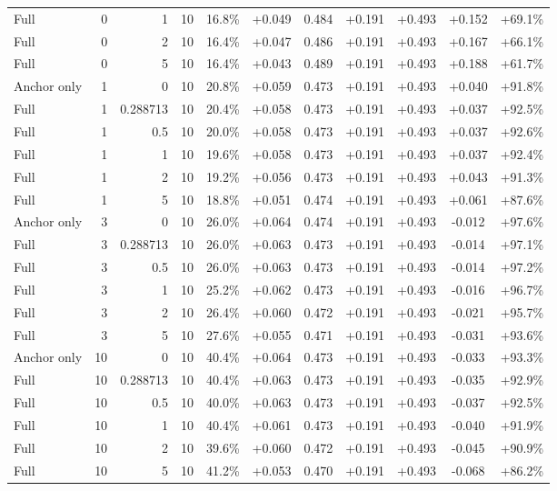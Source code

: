 \begin{table}[htbp]
\begin{tabular}{lrrrccccccc}
Full & 0 & 1 & 10 & 16.8\% & +0.049 & 0.484 & +0.191 & +0.493 & +0.152 & +69.1\% \\
Full & 0 & 2 & 10 & 16.4\% & +0.047 & 0.486 & +0.191 & +0.493 & +0.167 & +66.1\% \\
Full & 0 & 5 & 10 & 16.4\% & +0.043 & 0.489 & +0.191 & +0.493 & +0.188 & +61.7\% \\
Anchor only & 1 & 0 & 10 & 20.8\% & +0.059 & 0.473 & +0.191 & +0.493 & +0.040 & +91.8\% \\
Full & 1 & 0.288713 & 10 & 20.4\% & +0.058 & 0.473 & +0.191 & +0.493 & +0.037 & +92.5\% \\
Full & 1 & 0.5 & 10 & 20.0\% & +0.058 & 0.473 & +0.191 & +0.493 & +0.037 & +92.6\% \\
Full & 1 & 1 & 10 & 19.6\% & +0.058 & 0.473 & +0.191 & +0.493 & +0.037 & +92.4\% \\
Full & 1 & 2 & 10 & 19.2\% & +0.056 & 0.473 & +0.191 & +0.493 & +0.043 & +91.3\% \\
Full & 1 & 5 & 10 & 18.8\% & +0.051 & 0.474 & +0.191 & +0.493 & +0.061 & +87.6\% \\
Anchor only & 3 & 0 & 10 & 26.0\% & +0.064 & 0.474 & +0.191 & +0.493 & -0.012 & +97.6\% \\
Full & 3 & 0.288713 & 10 & 26.0\% & +0.063 & 0.473 & +0.191 & +0.493 & -0.014 & +97.1\% \\
Full & 3 & 0.5 & 10 & 26.0\% & +0.063 & 0.473 & +0.191 & +0.493 & -0.014 & +97.2\% \\
Full & 3 & 1 & 10 & 25.2\% & +0.062 & 0.473 & +0.191 & +0.493 & -0.016 & +96.7\% \\
Full & 3 & 2 & 10 & 26.4\% & +0.060 & 0.472 & +0.191 & +0.493 & -0.021 & +95.7\% \\
Full & 3 & 5 & 10 & 27.6\% & +0.055 & 0.471 & +0.191 & +0.493 & -0.031 & +93.6\% \\
Anchor only & 10 & 0 & 10 & 40.4\% & +0.064 & 0.473 & +0.191 & +0.493 & -0.033 & +93.3\% \\
Full & 10 & 0.288713 & 10 & 40.4\% & +0.063 & 0.473 & +0.191 & +0.493 & -0.035 & +92.9\% \\
Full & 10 & 0.5 & 10 & 40.0\% & +0.063 & 0.473 & +0.191 & +0.493 & -0.037 & +92.5\% \\
Full & 10 & 1 & 10 & 40.4\% & +0.061 & 0.473 & +0.191 & +0.493 & -0.040 & +91.9\% \\
Full & 10 & 2 & 10 & 39.6\% & +0.060 & 0.472 & +0.191 & +0.493 & -0.045 & +90.9\% \\
Full & 10 & 5 & 10 & 41.2\% & +0.053 & 0.470 & +0.191 & +0.493 & -0.068 & +86.2\% \\

\end{tabular}
\end{table}
